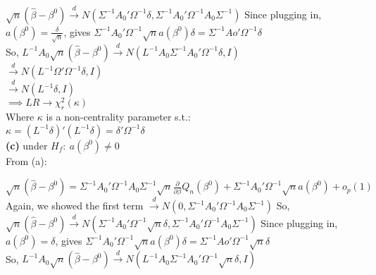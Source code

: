 \documentclass[11pt]{article}
\theoremstyle{definition}
\def\indist{\stackrel{d}{\rightarrow}}
\begin{document}
$\sqrt{n}(\hat{\beta}-\beta^{0}) \indist N(\Sigma^{-1}A_{0}'\Omega^{-1}\delta, \Sigma^{-1}A_{0}'\Omega^{-1}A_{0}\Sigma^{-1})$ Since plugging in, \\

$a(\beta^{0})= \frac{\delta}{\sqrt{n}}$, gives $\Sigma^{-1}A_{0}'\Omega^{-1}\sqrt{n}a(\beta^{0})\delta=\Sigma^{-1}Ao'\Omega^{-1}\delta$ \\

So, $L^{-1}A_{0}\sqrt{n}(\hat{\beta}-\beta^{0}) \indist N(L^{-1}A_{0}\Sigma^{-1}A_{0}'\Omega^{-1}\delta, I)$ \\

\hspace{37mm} $\indist N(L^{-1}\Omega'\Omega^{-1}\delta, I)$ \\

\hspace{37mm} $\indist N(L^{-1}\delta, I)$ \\

$\implies LR \rightarrow \chi_{r}^{2}(\kappa)$ \\

Where $\kappa$ is a non-centrality parameter s.t.: \\

$\kappa=\left(L^{-1}\delta\right)'\left(L^{-1}\delta\right)=\delta'\Omega^{-1}\delta$ \\

\noindent
\textbf{(c)} under $H_{f}: \ a(\beta^{0})\neq 0$ \\

From (a):

$\sqrt{n}(\hat{\beta}-\beta^{0})=\Sigma^{-1}A_{0}'\Omega^{-1}A_{0}\Sigma^{-1}\sqrt{n}\frac{\partial}{\partial \beta}Q_{n}(\beta^{0})+\Sigma^{-1}A_{0}'\Omega^{-1}\sqrt{n}a(\beta^{0})+o_{p}(1)$ \\ 

Again, we showed the first term $\indist N(0, \Sigma^{-1}A_{0}'\Omega^{-1}A_{0}\Sigma^{-1})$ So, \\

$\sqrt{n}(\hat{\beta}-\beta^{0}) \indist N(\Sigma^{-1}A_{0}'\Omega^{-1}\sqrt{n}\delta, \Sigma^{-1}A_{0}'\Omega^{-1}A_{0}\Sigma^{-1})$ Since plugging in, \\

$a(\beta^{0})= \delta$, gives $\Sigma^{-1}A_{0}'\Omega^{-1}\sqrt{n}a(\beta^{0})\delta=\Sigma^{-1}Ao'\Omega^{-1}\sqrt{n}\delta$ \\

So, $L^{-1}A_{0}\sqrt{n}(\hat{\beta}-\beta^{0}) \indist N(L^{-1}A_{0}\Sigma^{-1}A_{0}'\Omega^{-1}\sqrt{n}\delta, I)$ \\
\end{document}
